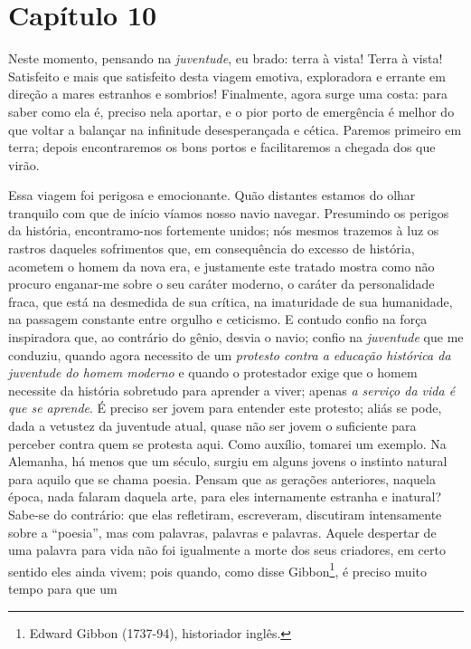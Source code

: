 \chapter{Capítulo 10}\label{capuxedtulo-10}

Neste momento, pensando na \emph{juventude}, eu brado: terra à
    vista! Terra à vista! Satisfeito e mais que satisfeito desta viagem
    emotiva, exploradora e errante em direção a mares estranhos e
    sombrios! Finalmente, agora surge uma costa: para saber como ela é,
    preciso nela aportar, e o pior porto de emergência é melhor do que
    voltar a balançar na infinitude desesperançada e cética. Paremos
    primeiro em terra; depois encontraremos os bons portos e
    facilitaremos a chegada dos que virão.

    Essa viagem foi perigosa e emocionante. Quão distantes estamos do
    olhar tranquilo com que de início víamos nosso navio navegar.
    Presumindo os perigos da história, encontramo-nos fortemente unidos;
    nós mesmos trazemos à luz os rastros daqueles sofrimentos que, em
    consequência do excesso de história, acometem o homem da nova era, e
    justamente este tratado mostra como não procuro enganar-me sobre o
    seu caráter moderno, o caráter da personalidade fraca, que está na
    desmedida de sua crítica, na imaturidade de sua humanidade, na
    passagem constante entre orgulho e ceticismo. E contudo confio na
    força inspiradora que, ao contrário do gênio, desvia o navio; confio
    na \emph{juventude} que me conduziu, quando agora necessito de um
    \emph{protesto contra a educação histórica da juventude do homem
    moderno} e quando o protestador exige que o homem necessite da
    história sobretudo para aprender a viver; apenas \emph{a serviço da
    vida é que se aprende}. É preciso ser jovem para entender este
    protesto; aliás se pode, dada a vetustez da juventude atual, quase
    não ser jovem o suficiente para perceber contra quem se protesta
    aqui. Como auxílio, tomarei um exemplo. Na Alemanha, há menos que um
    século, surgiu em alguns jovens o instinto natural para aquilo que se
    chama poesia. Pensam que as gerações anteriores, naquela época, nada
    falaram daquela arte, para eles internamente estranha e inatural?
    Sabe-se do contrário: que elas refletiram, escreveram, discutiram
    intensamente sobre a ``poesia'', mas com palavras, palavras e
    palavras. Aquele despertar de uma palavra para vida não foi
    igualmente a morte dos seus criadores, em certo sentido eles ainda
    vivem; pois quando, como disse Gibbon\footnote{Edward Gibbon
      (1737-94), historiador inglês.}, é preciso muito tempo para que um
